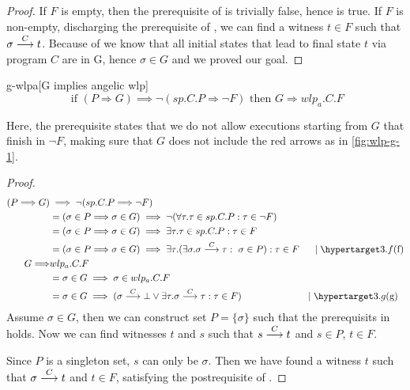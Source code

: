 \begin{proof}
If $F$ is empty, then the prerequisite of  is trivially false, hence  is true. 
If $F$ is non-empty, discharging the prerequisite of , we can find a witness $t\in F$ such that $\sigma\stackrel{C}{\longrightarrow}t$. 
Because of  we know that all initial states that lead to final state $t$ via program $C$ are in G, hence $\sigma\in G$ and we proved our goal. 
\end{proof}


\begin{lemma}{g-wlpa}[G implies angelic wlp]
\ \\ \vspace{-3mm}
	\[%
	\text{ if \ \ \ \ } 
	(P\Longrightarrow G) \implies \neg(sp.C.P \Longrightarrow \neg F)
	\text{\ \ \ \  then\ \ \ \  } 
	G \Longrightarrow wlp_a.C.F
	\] 
\end{lemma}
Here, the prerequisite states that we do not allow executions starting from $G$ that  finish in $\neg F$, making sure that $G$ does not include the red arrows as in \autoref{fig:wlp-g-1}.  

\begin{proof}
\begin{align*} 
	(P\Longrightarrow G) & \implies \neg(sp.C.P \Longrightarrow \neg F) \\ 
	&= (\sigma\in P \Longrightarrow \sigma\in G) \implies \neg(\forall\tau.\tau\in sp.C.P:\tau\in\neg F) \\ 
	&= (\sigma\in P \Longrightarrow \sigma\in G) \implies \exists\tau.\tau\in sp.C.P:\tau\in F \\ 
	&= (\sigma\in P \Longrightarrow \sigma\in G) \implies \exists\tau.(\exists \sigma. \sigma\goto{C}\tau: \  \sigma\in P):\tau\in F 
		\hspace{0.04\textwidth}\mid\lblth{f}\\ 
	G\Longrightarrow & wlp_a.C.F \\ 
	&= \sigma\in G\implies\sigma\in wlp_a.C.F\\
	&=\sigma\in G\implies (\sigma\goto{C}\bot\vee \exists \tau.\sigma\goto{C}\tau:\tau\in F) 
		\hspace{0.195\textwidth}\mid\lblth{g}\\
\end{align*}
Assume $\sigma\in G$, then we can construct set $P=\{\sigma\}$ such that the prerequisits in  holds. 
Now we can find witnesses $t$ and $s$ such that $s\stackrel{C}{\longrightarrow}t$ and $s\in P$, $t\in F$. 

Since $P$ is a singleton set, $s$ can only be $\sigma$. 
Then we have found a witness $t$ such that $\sigma\stackrel{C}{\longrightarrow}t$ and $t\in F$, satisfying the postrequisite of . 
\end{proof}


